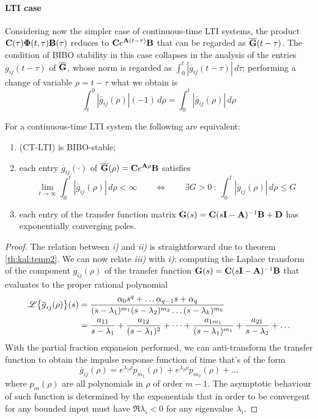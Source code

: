 	\paragraph{LTI case} Considering now the simpler case of continuous-time LTI systems, the product $\mathbf{C}(\tau)\mathbf{\Phi}(t,\tau)\mathbf{B}(\tau)$ reduces to $\mathbf{C} e^{\mathbf{A} (t-\tau)} \mathbf{B}$ that can be regarded as $\overline {\mathbf{G}}(t-\tau)$. The condition of BIBO stability in this case collapses in the analysis of the entries $\overline g_{ij}(t-\tau)$ of $\overline {\mathbf{G}}$, whose norm is regarded as $\int_0^t |\overline g_{ij}(t-\tau)|\,d\tau$; performing a change of variable $\rho = t-\tau$ what we obtain is
	\[ \int_t^0 |\overline g_{ij}(\rho)| (-1)\, d\rho = \int_0^t |\overline g_{ij}(\rho)|\, d\rho \]
	\begin{theorem}
		For a continuous-time LTI system the following are equivalent:
		\begin{enumerate}[\itshape i)]
			\item (CT-LTI) is BIBO-stable;
			\item each entry $\overline g_{ij}(\cdot)$ of $\overline {\mathbf{G}}(\rho) = \mathbf{C} e^{\mathbf{A}\rho}\mathbf{B}$ satisfies
			\[ \lim_{t\rightarrow \infty} \int_0^t |\overline g_{ij}(\rho)|\, d\rho  < \infty \qquad \Leftrightarrow \qquad \exists G > 0 \ : \ \int_0^t|\overline g_{ij}(\rho)|\,d\rho \leq G \]
			\item each entry of the transfer function matrix $\mathbf{G}(s) = \mathbf{C}(s\mathbf{I}-\mathbf{A})^{-1}\mathbf{B} + \mathbf{D}$ has exponentially converging poles.
		\end{enumerate}
	\end{theorem}
	\begin{proof}
		The relation between \textit{i)} and \textit{ii)} is straightforward due to theorem \ref{th:kal:temp2}. We can now relate \textit{iii)} with \textit{i)}: computing the Laplace transform of the component $\overline g_{ij}(\rho)$ of the transfer function $\mathbf{G}(s) = \mathbf{C}(s\mathbf{I}-\mathbf{A})^{-1}\mathbf{B}$ that evaluates to the proper rational polynomial
		\begin{align*}
			\mathscr L\big\{ \overline g_{ij}(\rho) \big\}(s) & = \frac{\alpha_0 s^q + \dots \alpha_{q-1} s + \alpha_q}{(s-\lambda_1)^{m_1} (s-\lambda_2)^{m_2} \dots(s-\lambda_k)^{m_k}} \\ 
			& = \frac{a_{11}}{s-\lambda_1} + \frac{a_{12}}{(s-\lambda_1)^2} + \dots + \frac{a_{1m_1}}{(s-\lambda_1)^{m_1}} + \frac{a_{21}}{s-\lambda_2} + \dots
		\end{align*}
		With the partial fraction expansion performed, we can anti-transform the transfer function to obtain the impulse response function of time that's of the form
		\[ \overline g_{ij}(\rho) = e^{\lambda_1 \rho} p_{m_1}(\rho) + e^{\lambda_2 \rho} p_{m_2}(\rho) + \dots \]
		where $p_m(\rho)$ are all polynomials in $\rho$ of order $m-1$. The asymptotic behaviour of such function is determined by the exponentials that in order to be convergent for any bounded input must have $\Re{\lambda_i} < 0 $ for any eigenvalue $\lambda_i$.
	\end{proof}

